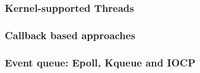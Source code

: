 % 
% 
\begin{frame}[fragile]
    \frametitle{Kernel-supported Threads}
\end{frame}
% 
% 
% 
% 
% 
% 
% 
% 
\begin{frame}[fragile]
    \frametitle{Callback based approaches}
\end{frame}
% 
% 
% 
% 
% 
% 
% 
% 
\begin{frame}[fragile]
    \frametitle{Event queue: Epoll, Kqueue and IOCP}
\end{frame}
